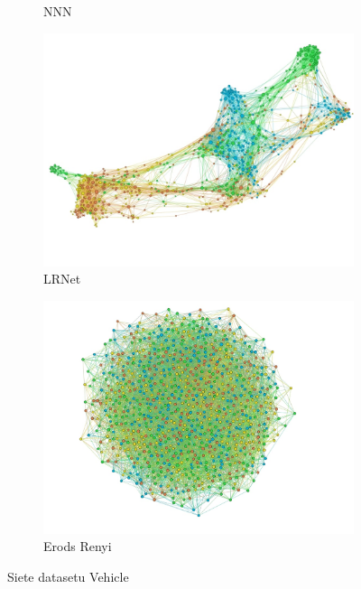 \documentclass[slovak,master,dept460,male,cpp,cpdeclaration]{diploma}
\begin{document}
\begin{figure}[H]
\begin{subfigure}{0.45\textwidth}
    \caption{NNN}
    \label{fig:wine_nnn}
\end{subfigure}
\medskip
\begin{subfigure}{0.45\textwidth}
    \centering
    \includegraphics[width=\linewidth, frame]{Graphs/network_vehicle_lrnet.jpg}
    \caption{LRNet}
    \label{fig:wine_lrnet}
\end{subfigure}\hfil
\begin{subfigure}{0.45\textwidth}
    \centering
    \includegraphics[width=\linewidth, frame]{Graphs/network_vehicle_erdos-renyi.jpg}
    \caption{Erods Renyi}
    \label{fig:wine_erdos_renyi}
\end{subfigure}
\caption{Siete datasetu Vehicle}
\label{fig:wine_networks}
\end{figure}
\end{document}
